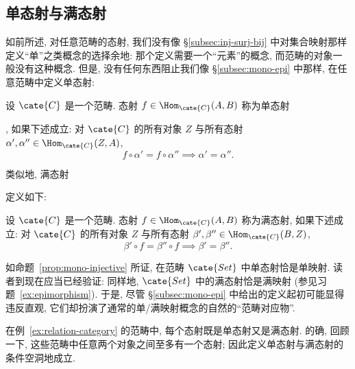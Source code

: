 \subsection{单态射与满态射}
\label{subsec:mono-epi-cats}

如前所述, 对任意范畴的态射, 我们没有像 \S\ref{subsec:inj-surj-bij} 中对集合映射那样定义``单''之类概念的选择余地: 那个定义需要一个``元素''的概念, 而范畴的对象一般没有这种概念. 但是, 没有任何东西阻止我们像 \S\ref{subsec:mono-epi} 中那样, 在任意范畴中定义单态射:

\begin{definition}
\label{def:monomorphism}
设 $\cate{C}$ 是一个范畴. 态射 $f \in \Hom_{\cate{C}}(A, B)$ 称为单态射%

, 如果下述成立: 对 $\cate{C}$ 的所有对象 $Z$ 与所有态射 $\alpha', \alpha'' \in \Hom_{\cate{C}}(Z, A)$,
\[
f \circ \alpha' = f \circ \alpha'' \implies \alpha' = \alpha''.
\]
\end{definition}

类似地, 满态射%

定义如下:

\begin{definition}
\label{def:epimorphism}
设 $\cate{C}$ 是一个范畴. 态射 $f \in \Hom_{\cate{C}}(A, B)$ 称为满态射, 如果下述成立: 对 $\cate{C}$ 的所有对象 $Z$ 与所有态射 $\beta', \beta'' \in \Hom_{\cate{C}}(B, Z)$,
\[
\beta' \circ f = \beta'' \circ f \implies \beta' = \beta''.
\]
\end{definition}

\begin{example}
\label{ex:mono-epi-set}
如命题~\ref{prop:mono-injective} 所证, 在范畴 $\cate{Set}$ 中单态射恰是单映射. 读者到现在应当已经验证: 同样地, $\cate{Set}$ 中的满态射恰是满映射 (参见习题~\ref{ex:epimorphism}). 于是, 尽管 \S\ref{subsec:mono-epi} 中给出的定义起初可能显得违反直观, 它们却扮演了通常的单/满映射概念的自然的``范畴对应物''.
\end{example}

\begin{example}
\label{ex:mono-epi-relation}
在例~\ref{ex:relation-category} 的范畴中, 每个态射既是单态射又是满态射. 的确, 回顾一下, 这些范畴中任意两个对象之间至多有一个态射; 因此定义单态射与满态射的条件空洞地成立.
\end{example}

